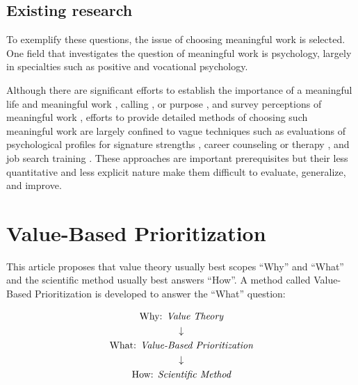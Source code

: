\documentclass[10pt, a4paper, twocolumn]{IEEEconf}
\begin{document}
\subsection{Existing research}

To exemplify these questions, the issue of choosing meaningful work is selected. One field that investigates the question of meaningful work is psychology, largely in specialties such as positive and vocational psychology.

Although there are significant efforts to establish the importance of a meaningful life \citep{martela2016three,baumeister1991meanings,frankl1985man,baumeister2013some,park2013assessing,allan2015meaning,heintzelman2013knowing} and meaningful work \citep{steger2013experiencing,dik2009calling,oades2017wiley,steger2009if}, calling \citep{dik2012make}, or purpose \citep{george2013meaning}, and survey perceptions of meaningful work \citep{steger2006meaning}, efforts to provide detailed methods of choosing such meaningful work are largely confined to vague techniques such as evaluations of psychological profiles for signature strengths \citep{seligman2006learned}, career counseling \citep{dik2009calling} or therapy \citep{wong2010meaning}, and job search training \citep{zikic2009job}. These approaches are important prerequisites but their less quantitative and less explicit nature make them difficult to evaluate, generalize, and improve.

\section{Value-Based Prioritization}

This article proposes that value theory usually best scopes \enquote{Why} and \enquote{What} and the scientific method usually best answers \enquote{How}.
A method called Value-Based Prioritization is developed to answer the \enquote{What} question:

\begin{equation*}
  \begin{gathered}
    \textrm{Why: } \textit{Value Theory} \\
    \downarrow \\
    \textrm{What: } \textit{\textit{Value-Based Prioritization}} \\
    \downarrow \\
    \textrm{How: } \textit{Scientific Method}
  \end{gathered}
\end{equation*}
\end{document}
